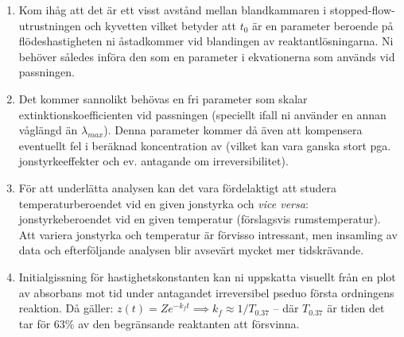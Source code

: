 \begin{enumerate}
\item Kom ihåg att det är ett visst
  avstånd mellan blandkammaren i stopped-flow-utrustningen och
  kyvetten vilket betyder att $t_0$ är en parameter beroende på
  flödeshastigheten ni åstadkommer vid blandingen av
  reaktantlösningarna. Ni behöver således införa den som en parameter i
  ekvationerna som används vid passningen.
\item Det kommer sannolikt behövas en fri parameter som skalar
  extinktionskoefficienten vid passningen (speciellt ifall ni använder en
  annan våglängd än $\lambda_{max}$). Denna parameter kommer då även att
  kompensera eventuellt fel i beräknad koncentration av 
  (vilket kan vara ganska stort pga. jonstyrkeeffekter och ev. antagande
  om irreversibilitet).
\item För att underlätta analysen kan det vara fördelaktigt att studera
  temperaturberoendet vid en given jonstyrka och {\em vice versa}:
  jonstyrkeberoendet vid en given temperatur (förslagsvis
  rumstemperatur). Att variera jonstyrka och temperatur är
  förvisso intressant, men insamling av data och efterföljande analysen
  blir avsevärt mycket mer tidskrävande.
\item Initialgissning för hastighetskonstanten kan ni uppskatta visuellt
  från en plot av absorbans mot tid under antagandet irreversibel pseduo
  första ordningens reaktion. Då gäller: $z(t) = Ze^{-k_f t} \implies k_f
  \approx 1/T_{0.37}$ -- där $T_{0.37}$ är tiden det tar för 63\% av den
  begränsande reaktanten att försvinna.



\end{enumerate}

